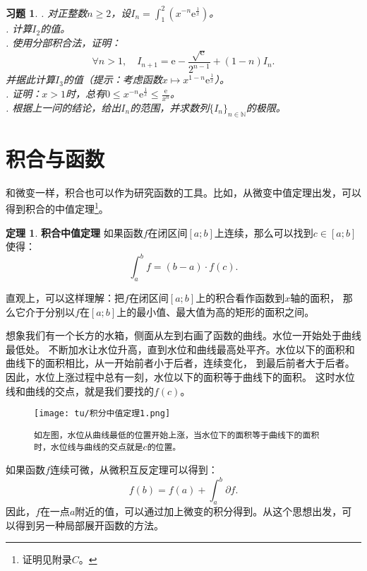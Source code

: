 \documentclass[12pt,UTF8]{ctexbook}
\theoremstyle{definition}
\newtheorem{tm}{定理}[section]
\theoremstyle{plain}
\newtheorem{xt}{习题}[section]
\begin{document}
\begin{xt}
    . 对正整数$n\geqslant 2$，设$\displaystyle I_n = \int_1^2 \left(x^{-n}\mathrm{e}^{\frac{1}{x}}\right)$。\\
    . 计算$I_2$的值。\\
    . 使用分部积合法，证明：
            $$\forall n > 1,\quad I_{n+1} = \mathrm{e} - \frac{\sqrt{\mathrm{e}}}{2^{n-1}} + (1 - n)I_n.$$
    \indent 并据此计算$I_3$的值（提示：考虑函数$x\mapsto x^{1-n}\mathrm{e}^{\frac{1}{x}}$）。\\
    . 证明：$x>1$时，总有$\displaystyle 0\leqslant x^{-n}\mathrm{e}^{\frac{1}{x}} \leqslant \frac{\mathrm{e}}{x^n}$。\\
    . 根据上一问的结论，给出$I_n$的范围，并求数列$\{I_n\}_{n\in\mathbb{N}}$的极限。
\end{xt}

\section{积合与函数}

和微变一样，积合也可以作为研究函数的工具。比如，从微变中值定理出发，可以得到积合的中值定理\footnote{证明见附录$C$。}。

\begin{tm}{\textbf{积合中值定理}}
    如果函数$f$在闭区间$[a; b]$上连续，那么可以找到$c\in[a;b]$使得：
    $$ \int_a^b f = (b - a)\cdot f(c).$$
\end{tm}

直观上，可以这样理解：把$f$在闭区间$[a; b]$上的积合看作函数到$x$轴的面积，
那么它介于分别以$f$在$[a; b]$上的最小值、最大值为高的矩形的面积之间。

想象我们有一个长方的水箱，侧面从左到右画了函数的曲线。水位一开始处于曲线最低处。
不断加水让水位升高，直到水位和曲线最高处平齐。水位以下的面积和曲线下的面积相比，从一开始前者小于后者，连续变化，
到最后前者大于后者。因此，水位上涨过程中总有一刻，水位以下的面积等于曲线下的面积。
这时水位线和曲线的交点，就是我们要找的$f(c)$。

\begin{figure}[h] %
    \vspace{4pt}
    \centering
    \texttt{[image: tu/积分中值定理1.png]}
    \caption*{\texttt{如左图，水位从曲线最低的位置开始上涨，当水位下的面积等于曲线下的面积时，水位线与曲线的交点就是}$c$\texttt{的位置。}}
\end{figure}

如果函数$f$连续可微，从微积互反定理可以得到：
$$ f(b) = f(a) + \int_a^b \partial f .$$
因此，$f$在一点$a$附近的值，可以通过加上微变的积分得到。从这个思想出发，可以得到另一种局部展开函数的方法。
\end{document}
